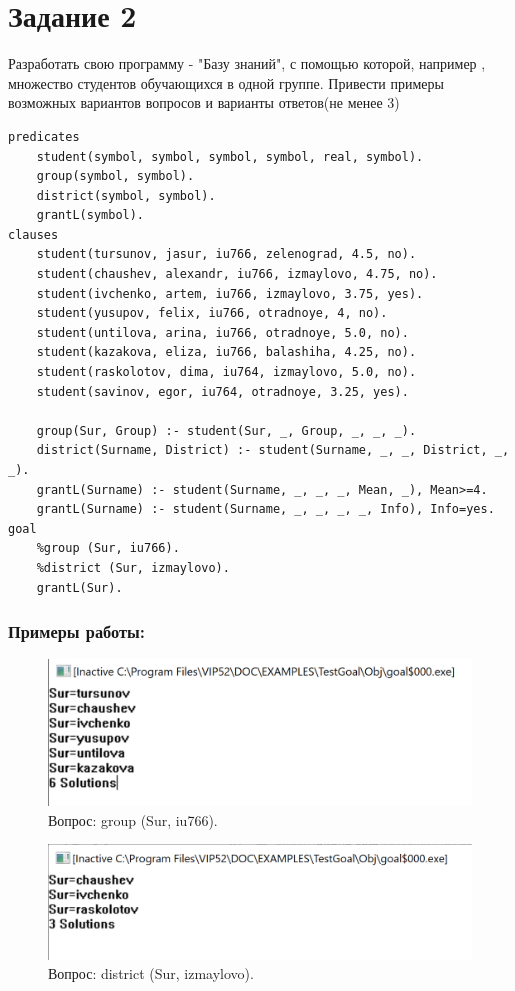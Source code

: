\documentclass[a4paper, 12pt]{article}
\begin{document}
\section*{Задание 2}
Разработать свою программу - "Базу знаний", с помощью которой, например , множество студентов обучающихся в одной группе. Привести примеры возможных вариантов вопросов и варианты ответов(не менее 3)
\begin{lstlisting}
predicates
	student(symbol, symbol, symbol, symbol, real, symbol).
	group(symbol, symbol).
	district(symbol, symbol).
	grantL(symbol).
clauses
	student(tursunov, jasur, iu766, zelenograd, 4.5, no).
	student(chaushev, alexandr, iu766, izmaylovo, 4.75, no).
	student(ivchenko, artem, iu766, izmaylovo, 3.75, yes).
	student(yusupov, felix, iu766, otradnoye, 4, no).
	student(untilova, arina, iu766, otradnoye, 5.0, no).
	student(kazakova, eliza, iu766, balashiha, 4.25, no).
	student(raskolotov, dima, iu764, izmaylovo, 5.0, no).
	student(savinov, egor, iu764, otradnoye, 3.25, yes).

	group(Sur, Group) :- student(Sur, _, Group, _, _, _).
	district(Surname, District) :- student(Surname, _, _, District, _, _).
	grantL(Surname) :- student(Surname, _, _, _, Mean, _), Mean>=4.
	grantL(Surname) :- student(Surname, _, _, _, _, Info), Info=yes.
goal
	%group (Sur, iu766).	
	%district (Sur, izmaylovo).
	grantL(Sur).
\end{lstlisting}
\clearpage
\newpage
\subsubsection*{Примеры работы:}

\begin{figure}[h!]
	\centering \includegraphics[scale=1]{2.1}
	\centering\caption{Вопрос: group (Sur, iu766).}
\end{figure}

\begin{figure}[h!]
	\centering \includegraphics[scale=1]{2.2}
	\centering\caption{Вопрос: district (Sur, izmaylovo).}
\end{figure}
\end{document}
